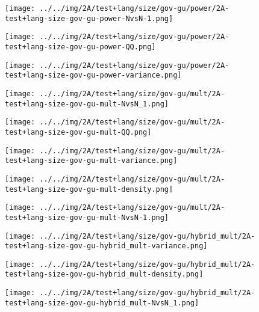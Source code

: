 \begin{figure}[H]
\centering	\texttt{[image: ../../img/2A/test+lang/size/gov-gu/power/2A-test+lang-size-gov-gu-power-NvsN-1.png]}
\end{figure}
\begin{figure}[H]
\centering	\texttt{[image: ../../img/2A/test+lang/size/gov-gu/power/2A-test+lang-size-gov-gu-power-QQ.png]}
\end{figure}
\begin{figure}[H]
\centering	\texttt{[image: ../../img/2A/test+lang/size/gov-gu/power/2A-test+lang-size-gov-gu-power-variance.png]}
\end{figure}
\begin{figure}[H]
\centering	\texttt{[image: ../../img/2A/test+lang/size/gov-gu/mult/2A-test+lang-size-gov-gu-mult-NvsN\_1.png]}
\end{figure}
\begin{figure}[H]
\centering	\texttt{[image: ../../img/2A/test+lang/size/gov-gu/mult/2A-test+lang-size-gov-gu-mult-QQ.png]}
\end{figure}
\begin{figure}[H]
\centering	\texttt{[image: ../../img/2A/test+lang/size/gov-gu/mult/2A-test+lang-size-gov-gu-mult-variance.png]}
\end{figure}
\begin{figure}[H]
\centering	\texttt{[image: ../../img/2A/test+lang/size/gov-gu/mult/2A-test+lang-size-gov-gu-mult-density.png]}
\end{figure}
\begin{figure}[H]
\centering	\texttt{[image: ../../img/2A/test+lang/size/gov-gu/mult/2A-test+lang-size-gov-gu-mult-NvsN-1.png]}
\end{figure}
\begin{figure}[H]
\centering	\texttt{[image: ../../img/2A/test+lang/size/gov-gu/hybrid\_mult/2A-test+lang-size-gov-gu-hybrid\_mult-variance.png]}
\end{figure}
\begin{figure}[H]
\centering	\texttt{[image: ../../img/2A/test+lang/size/gov-gu/hybrid\_mult/2A-test+lang-size-gov-gu-hybrid\_mult-density.png]}
\end{figure}
\begin{figure}[H]
\centering	\texttt{[image: ../../img/2A/test+lang/size/gov-gu/hybrid\_mult/2A-test+lang-size-gov-gu-hybrid\_mult-NvsN\_1.png]}
\end{figure}
